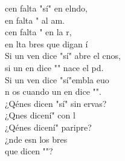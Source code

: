 \begin{cancion}%
	cen falta "sí" en elndo, \\
	en falta " al am.\\
	cen falta " en la r,  \\
	en lta bres que digan í\\
	Si un ven dice "sí" abre el cnos,\\
	si un en dice "" nace el pd.\\
	Si un ven dice "sí"embla euo\\
	n os cuando un en dice "". \\
	¿Qénes dicen "sí" sin ervas?\\
	¿Qnes dicení" con l \\
	¿Qénes dicení" paripre? \\
	¿nde esn los bres   \\
	que dicen ""? \\
\end{cancion}%
